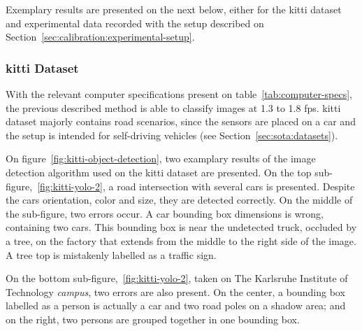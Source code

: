 Exemplary results are presented on the next below, either for the \ac{kitti} dataset and experimental data recorded with the setup described on Section~\ref{sec:calibration:experimental-setup}.
	
\subsubsection{\ac{kitti} Dataset}
With the relevant computer specifications present on table~\ref{tab:computer-specs}, the previous described method is able to classify images at 1.3 to 1.8 \ac{fps}. \ac{kitti} dataset majorly contains road scenarios, since the sensors are placed on a car and the setup is intended for self-driving vehicles (see Section~\ref{sec:sota:datasets}).

On figure~\ref{fig:kitti-object-detection}, two examplary results of the image detection algorithm used on the \ac{kitti} dataset are presented. On the top sub-figure,~\ref{fig:kitti-yolo-2}, a road intersection with several cars is presented. Despite the cars orientation, color and size, they are detected correctly. On the middle of the sub-figure, two errors occur. A car bounding box dimensions is wrong, containing two cars. This bounding box is near the undetected truck, occluded by a tree, on the factory that extends from the middle to the right side of the image. A tree top is mistakenly labelled as a traffic sign.

On the bottom sub-figure,~\ref{fig:kitti-yolo-2}, taken on The Karlsruhe Institute of Technology \textit{campus}, two errors are also present. On the center, a bounding box labelled as a person is actually a car and two road poles on a shadow area; and on the right, two persons are grouped together in one bounding box.
	
